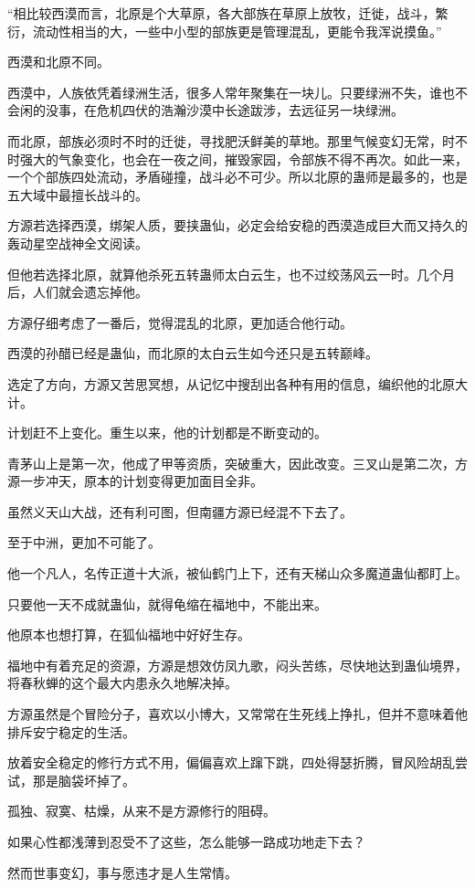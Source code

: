 \begin{this_body}
“相比较西漠而言，北原是个大草原，各大部族在草原上放牧，迁徙，战斗，繁衍，流动性相当的大，一些中小型的部族更是管理混乱，更能令我浑说摸鱼。”

西漠和北原不同。

西漠中，人族依凭着绿洲生活，很多人常年聚集在一块儿。只要绿洲不失，谁也不会闲的没事，在危机四伏的浩瀚沙漠中长途跋涉，去远征另一块绿洲。

而北原，部族必须时不时的迁徙，寻找肥沃鲜美的草地。那里气候变幻无常，时不时强大的气象变化，也会在一夜之间，摧毁家园，令部族不得不再次。如此一来，一个个部族四处流动，矛盾碰撞，战斗必不可少。所以北原的蛊师是最多的，也是五大域中最擅长战斗的。

方源若选择西漠，绑架人质，要挟蛊仙，必定会给安稳的西漠造成巨大而又持久的轰动星空战神全文阅读。

但他若选择北原，就算他杀死五转蛊师太白云生，也不过绞荡风云一时。几个月后，人们就会遗忘掉他。

方源仔细考虑了一番后，觉得混乱的北原，更加适合他行动。

西漠的孙醋已经是蛊仙，而北原的太白云生如今还只是五转巅峰。

选定了方向，方源又苦思冥想，从记忆中搜刮出各种有用的信息，编织他的北原大计。

计划赶不上变化。重生以来，他的计划都是不断变动的。

青茅山上是第一次，他成了甲等资质，突破重大，因此改变。三叉山是第二次，方源一步冲天，原本的计划变得更加面目全非。

虽然义天山大战，还有利可图，但南疆方源已经混不下去了。

至于中洲，更加不可能了。

他一个凡人，名传正道十大派，被仙鹤门上下，还有天梯山众多魔道蛊仙都盯上。

只要他一天不成就蛊仙，就得龟缩在福地中，不能出来。

他原本也想打算，在狐仙福地中好好生存。

福地中有着充足的资源，方源是想效仿凤九歌，闷头苦练，尽快地达到蛊仙境界，将春秋蝉的这个最大内患永久地解决掉。

方源虽然是个冒险分子，喜欢以小博大，又常常在生死线上挣扎，但并不意味着他排斥安宁稳定的生活。

放着安全稳定的修行方式不用，偏偏喜欢上蹿下跳，四处得瑟折腾，冒风险胡乱尝试，那是脑袋坏掉了。

孤独、寂寞、枯燥，从来不是方源修行的阻碍。

如果心性都浅薄到忍受不了这些，怎么能够一路成功地走下去？

然而世事变幻，事与愿违才是人生常情。


\end{this_body}
